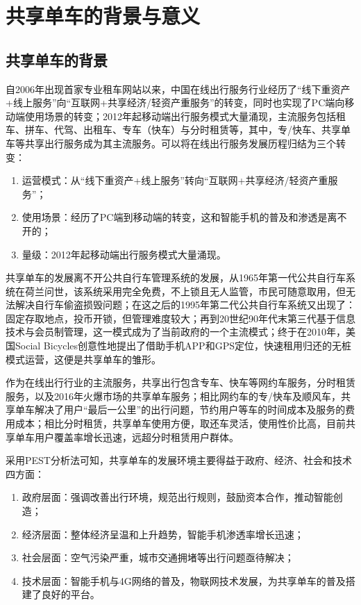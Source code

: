 \section{共享单车的背景与意义}
\subsection{共享单车的背景}
自2006年出现首家专业租车网站以来，中国在线出行服务行业经历了“线下重资产+线上服务”向“互联网+共享经济/轻资产重服务”的转变，同时也实现了PC端向移动端使用场景的转变；2012年起移动端出行服务模式大量涌现，主流服务包括租车、拼车、代驾、出租车、专车（快车）与分时租赁等，其中，专/快车、共享单车等共享出行服务成为其主流服务\cite{陈正豪2017从三个方面看一看共享单车的行业背景}。可以将在线出行服务发展历程归结为三个转变：
\begin{enumerate}
    \item 运营模式：从“线下重资产+线上服务”转向“互联网+共享经济/轻资产重服务”；
    \item 使用场景：经历了PC端到移动端的转变，这和智能手机的普及和渗透是离不开的；
    \item 量级：2012年起移动端出行服务模式大量涌现。
\end{enumerate}

共享单车的发展离不开公共自行车管理系统的发展，从1965年第一代公共自行车系统在荷兰问世，该系统采用完全免费，不上锁且无人监管，市民可随意取用，但无法解决自行车偷盗损毁问题；在这之后的1995年第二代公共自行车系统又出现了：固定存取地点，投币开锁，但管理难度较大；再到20世纪90年代末第三代基于信息技术与会员制管理，这一模式成为了当前政府的一个主流模式；终于在2010年，美国Social Bicycles创意性地提出了借助手机APP和GPS定位，快速租用归还的无桩模式运营，这便是共享单车的雏形\cite{陈正豪2017从三个方面看一看共享单车的行业背景,刘亚楠2017共享单车发展研究分析}。

作为在线出行行业的主流服务，共享出行包含专车、快车等网约车服务，分时租赁服务，以及2016年火爆市场的共享单车服务；相比网约车的专/快车及顺风车，共享单车解决了用户“最后一公里”的出行问题，节约用户等车的时间成本及服务的费用成本；相比分时租赁，共享单车使用方便，取还车灵活，使用性价比高，目前共享单车用户覆盖率增长迅速，远超分时租赁用户群体\cite{陈正豪2017从三个方面看一看共享单车的行业背景,李琨浩2017基于共享经济视角下城市共享单车发展对策研究}。

采用PEST分析法可知，共享单车的发展环境主要得益于政府、经济、社会和技术四方面\cite{陈正豪2017从三个方面看一看共享单车的行业背景}：
\begin{enumerate}
    \item 政府层面：强调改善出行环境，规范出行规则，鼓励资本合作，推动智能创造；
    \item 经济层面：整体经济呈温和上升趋势，智能手机渗透率增长迅速；
    \item 社会层面：空气污染严重，城市交通拥堵等出行问题亟待解决；
    \item 技术层面：智能手机与4G网络的普及，物联网技术发展，为共享单车的普及搭建了良好的平台。
\end{enumerate}


